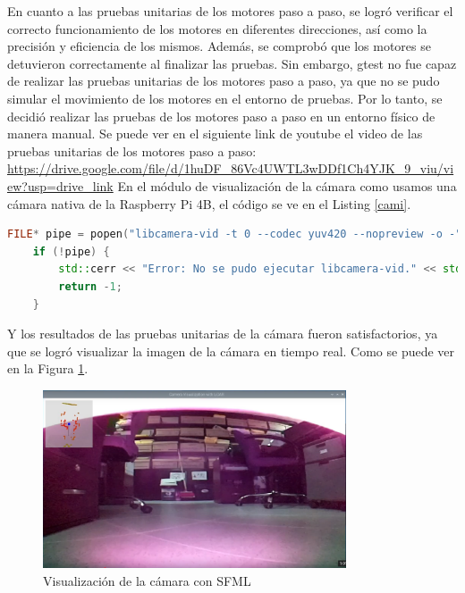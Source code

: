     En cuanto a las pruebas unitarias de los motores paso a paso, se logr\'o verificar el correcto funcionamiento de los motores en diferentes direcciones,
    as\'i como la precisi\'on y eficiencia de los mismos. Adem\'as, se comprob\'o que los motores se detuvieron correctamente al finalizar las pruebas.
    \vskip 0.5cm
    Sin embargo, gtest no fue capaz de realizar las pruebas unitarias de los motores paso a paso, ya que no se pudo simular el movimiento de los motores
    en el entorno de pruebas. Por lo tanto, se decidi\'o realizar las pruebas de los motores paso a paso en un entorno f\'isico de manera manual.
    Se puede ver en el siguiente link de youtube el video de las pruebas unitarias de los motores paso a paso: \url{https://drive.google.com/file/d/1huDF_86Vc4UWTL3wDDf1Ch4YJK_9_viu/view?usp=drive_link}
    \vskip 0.5cm
    En el m\'odulo de visualizaci\'on de la c\'amara como usamos una c\'amara nativa de la Raspberry Pi 4B, el c\'odigo se ve en el Listing \ref{cami}. 
    \begin{lstlisting}[language={C++}, caption={main.cpp}, label={cami}]
        FILE* pipe = popen("libcamera-vid -t 0 --codec yuv420 --nopreview -o -", "r");
    if (!pipe) {
        std::cerr << "Error: No se pudo ejecutar libcamera-vid." << std::endl;
        return -1;
    }
    \end{lstlisting}
    \vskip 0.5cm
    Y los resultados de las pruebas unitarias de la c\'amara fueron satisfactorios, ya que se logr\'o visualizar la imagen de la c\'amara en tiempo real.
    Como se puede ver en la Figura \ref{fig:CameraTest1}.
    \vskip 0.5cm
    \begin{figure}[htbp]
        \centering
        \includegraphics[width=0.8\textwidth]{./images/Pruebas/robot/CamaraSFML01.png}
        \caption{Visualizaci\'on de la c\'amara con SFML}
        \label{fig:CameraTest1}
    \end{figure}
